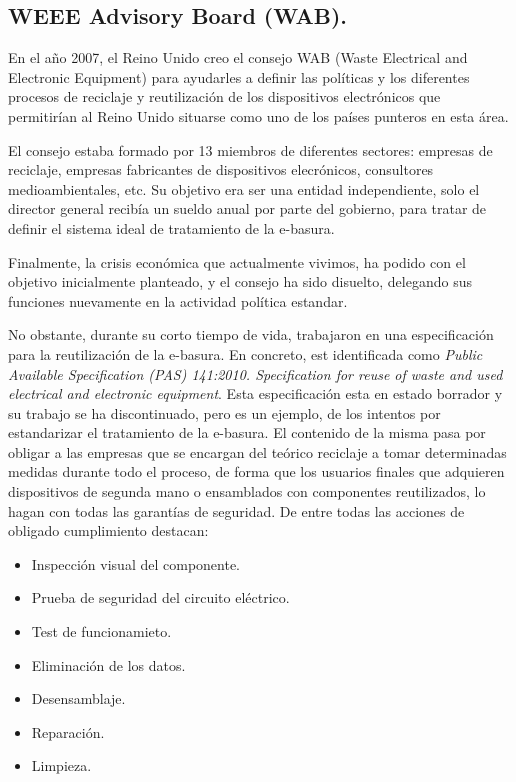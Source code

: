 \subsection{WEEE Advisory Board (WAB).}

En el año 2007, el Reino Unido creo el consejo WAB (Waste Electrical and Electronic Equipment) para ayudarles a definir las políticas y los diferentes procesos de reciclaje y reutilización de los dispositivos electrónicos que permitirían al Reino Unido situarse como uno de los países punteros en esta área.

El consejo estaba formado por 13 miembros de diferentes sectores: empresas de reciclaje, empresas fabricantes de dispositivos elecrónicos, consultores medioambientales, etc. Su objetivo era ser una entidad independiente, solo el director general recibía un sueldo anual por parte del gobierno, para tratar de definir el sistema ideal de tratamiento de la e-basura.

Finalmente, la crisis económica que actualmente vivimos, ha podido con el objetivo inicialmente planteado, y el consejo ha sido disuelto, delegando sus funciones nuevamente en la actividad política estandar.

No obstante, durante su corto tiempo de vida, trabajaron en una especificación para la reutilización de la e-basura. En concreto, est identificada como \emph{Public Available Specification (PAS) 141:2010. Specification for reuse of waste and used electrical and electronic equipment}. Esta especificación esta en estado borrador y su trabajo se ha discontinuado, pero es un ejemplo, de los intentos por estandarizar el tratamiento de la e-basura. El contenido de la misma pasa por obligar a las empresas que se encargan del teórico reciclaje a tomar determinadas medidas durante todo el proceso, de forma que los usuarios finales que adquieren dispositivos de segunda mano o ensamblados con componentes reutilizados, lo hagan con todas las garantías de seguridad. De entre todas las acciones de obligado cumplimiento destacan:

\begin{itemize}

\item{Inspección visual del componente.}
\item{Prueba de seguridad del circuito eléctrico.}
\item{Test de funcionamieto.}
\item{Eliminación de los datos.}
\item{Desensamblaje.}
\item{Reparación.}
\item{Limpieza.}

\end{itemize}

